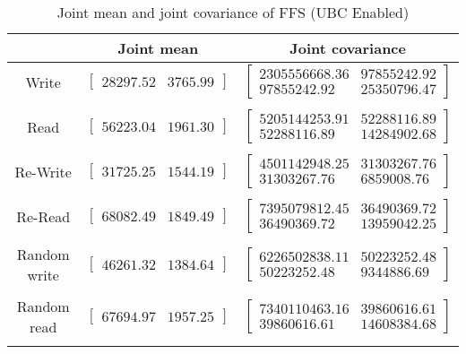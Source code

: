 
	\begin{table}
	\caption{Joint mean and joint covariance of FFS (UBC Enabled)}
	\begin{tabular}{| c | c | c |}
	\hline
	{} & \textbf{Joint mean} & \textbf{Joint covariance}\\
	\hline
	\hline
Write & $\left[ \begin{array}{rr} 28297.52 & 3765.99 \end{array}\right] $ & $\left[ \begin{array}{rr} 2305556668.36 & 97855242.92 \\ 97855242.92 & 25350796.47 \end{array}\right] $\\ 
{} & {} & {} \\ 
Read & $\left[ \begin{array}{rr} 56223.04 & 1961.30 \end{array}\right] $ & $\left[ \begin{array}{rr} 5205144253.91 & 52288116.89 \\ 52288116.89 & 14284902.68 \end{array}\right] $\\ 
{} & {} & {} \\ 
Re-Write & $\left[ \begin{array}{rr} 31725.25 & 1544.19 \end{array}\right] $ & $\left[ \begin{array}{rr} 4501142948.25 & 31303267.76 \\ 31303267.76 & 6859008.76 \end{array}\right] $\\ 
{} & {} & {} \\ 
Re-Read & $\left[ \begin{array}{rr} 68082.49 & 1849.49 \end{array}\right] $ & $\left[ \begin{array}{rr} 7395079812.45 & 36490369.72 \\ 36490369.72 & 13959042.25 \end{array}\right] $\\ 
{} & {} & {} \\ 
Random write & $\left[ \begin{array}{rr} 46261.32 & 1384.64 \end{array}\right] $ & $\left[ \begin{array}{rr} 6226502838.11 & 50223252.48 \\ 50223252.48 & 9344886.69 \end{array}\right] $\\ 
{} & {} & {} \\ 
Random read & $\left[ \begin{array}{rr} 67694.97 & 1957.25 \end{array}\right] $ & $\left[ \begin{array}{rr} 7340110463.16 & 39860616.61 \\ 39860616.61 & 14608384.68 \end{array}\right] $\\ 
{} & {} & {} \\ 

	\hline
	\end{tabular}
	\label{tbl:stat-ffs_ubc_enabled}
	\end{table}
